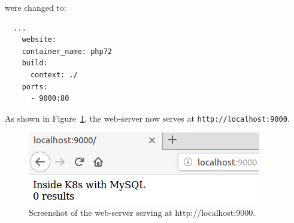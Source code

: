 \documentclass[11pt]{article}
\begin{document}
\begin{enumerate}
  were changed to:
  \begin{verbatim}
  ...
    website:
    container_name: php72
    build:
      context: ./
    ports:
      - 9000:80
  \end{verbatim}

  As shown in Figure~\ref{fig:home-9000}, the web-server now serves at \verb|http://localhost:9000|.
  \begin{figure}[htbp]
    \centering
    \includegraphics[width=.9\linewidth]{./home-9000.png}
    \caption{\label{fig:home-9000}
    Screenshot of the web-server serving at http://localhost:9000.}
  \end{figure}
\end{enumerate}
\end{document}
